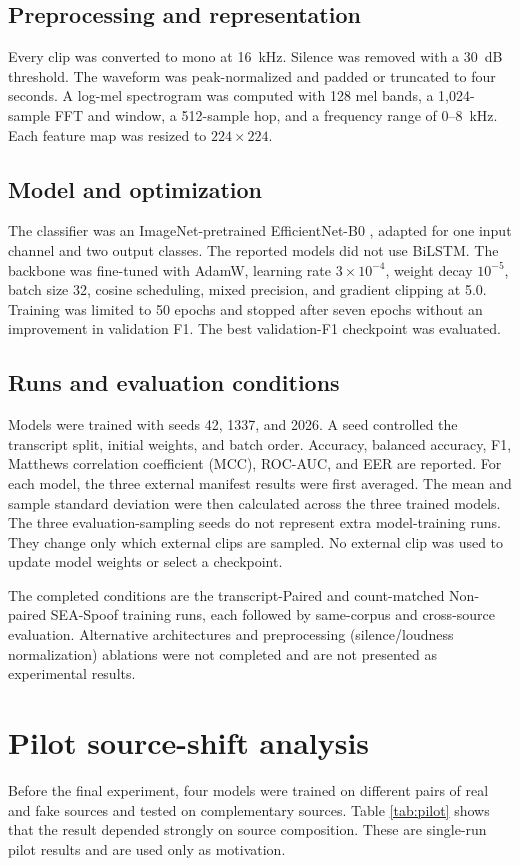 \documentclass[3p,times,procedia]{elsarticle}
\begin{document}
\subsection{Preprocessing and representation}
Every clip was converted to mono at 16~kHz. Silence was removed with a
30~dB threshold. The waveform was peak-normalized and padded or truncated
to four seconds. A log-mel spectrogram was computed with 128 mel bands, a
1,024-sample FFT and window, a 512-sample hop, and a frequency range of
0--8~kHz. Each feature map was resized to $224\times224$.

\subsection{Model and optimization}
The classifier was an ImageNet-pretrained EfficientNet-B0
\cite{tan2019efficientnet}, adapted for one input channel and two output
classes. The reported models did not use BiLSTM. The backbone was fine-tuned
with AdamW, learning rate $3\times10^{-4}$, weight decay $10^{-5}$, batch
size 32, cosine scheduling, mixed precision, and gradient clipping at 5.0.
Training was limited to 50 epochs and stopped after seven epochs without an
improvement in validation F1. The best validation-F1 checkpoint was evaluated.

\subsection{Runs and evaluation conditions}
Models were trained with seeds 42, 1337, and 2026. A seed controlled the
transcript split, initial weights, and batch order. Accuracy,
balanced accuracy, F1, Matthews correlation coefficient (MCC), ROC-AUC, and
EER are reported. For each model, the three external manifest results were first averaged.
The mean and sample standard deviation
were then calculated across the three
trained models. The three evaluation-sampling seeds do not represent extra
model-training runs. They change only which external clips are sampled. No
external clip was used to update model weights or select a checkpoint.

The completed conditions are the transcript-Paired and count-matched
Non-paired SEA-Spoof training runs, each followed by same-corpus and
cross-source evaluation. Alternative architectures and preprocessing
(silence/loudness normalization) ablations were not completed and are not
presented as experimental results.

\section{Pilot source-shift analysis}
Before the final experiment, four models were trained on different pairs of
real and fake sources and tested on complementary sources. Table
\ref{tab:pilot} shows that the result depended strongly on source
composition. These are single-run pilot results and are used only as
motivation.
\end{document}
